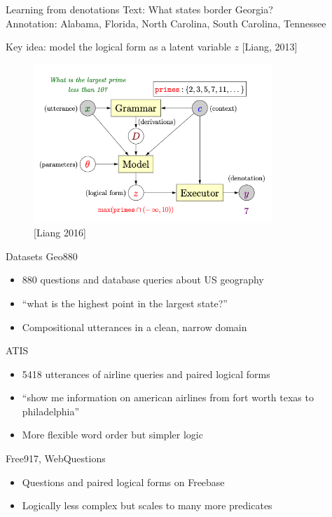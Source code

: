 \documentclass[usenames,dvipsnames,notes,11pt,aspectratio=169]{beamer}
\begin{document}
\begin{frame}
    {Learning from denotations}
    Text: What states border Georgia? \\
    Annotation: Alabama, Florida, North Carolina, South Carolina, Tennessee

    {Key idea}: model the logical form as a latent variable $z$ [Liang, 2013]

    \begin{figure}
        \includegraphics[height=6cm]{figures/framework}
        \caption{[Liang 2016]}
    \end{figure}
\end{frame}

\begin{frame}
    {Datasets}
    {Geo880}\\
    \begin{itemize}
        \item 880 questions and database queries about US geography
        \item ``what is the highest point in the largest state?''
        \item Compositional utterances in a clean, narrow domain
    \end{itemize}

    {ATIS}\\
    \begin{itemize}
        \item 5418 utterances of airline queries and paired logical forms
        \item ``show me information on american airlines from fort worth texas to philadelphia''
        \item More flexible word order but simpler logic
    \end{itemize}

    {Free917, WebQuestions}\\
    \begin{itemize}
        \item Questions and paired logical forms on Freebase
        \item Logically less complex but scales to many more predicates
    \end{itemize}
\end{frame}
\end{document}
